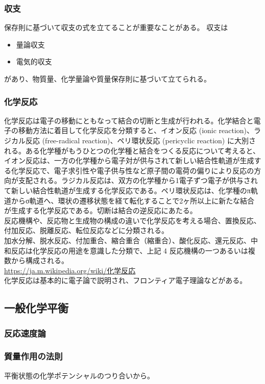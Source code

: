 \documentclass[dvipdfmx,uplatex]{jsarticle}
\begin{document}
\subsubsection{収支}
保存則に基づいて収支の式を立てることが重要なことがある。
収支は \\
\begin{itemize}
\item 量論収支
\item 電気的収支
\end{itemize}
があり、物質量、化学量論や質量保存則に基づいて立てられる。

\subsubsection{化学反応}
化学反応は電子の移動にともなって結合の切断と生成が行われる。化学結合と電子の移動方法に着目して化学反応を分類すると、イオン反応 (ionic reaction)、ラジカル反応 (free-radical reaction)、ペリ環状反応 (pericyclic reaction) に大別される。ある化学種がもうひとつの化学種と結合をつくる反応について考えると、イオン反応は、一方の化学種から電子対が供与されて新しい結合性軌道が生成する化学反応で、電子求引性や電子供与性など原子間の電荷の偏りにより反応の方向が支配される。ラジカル反応は、双方の化学種から1電子ずつ電子が供与されて新しい結合性軌道が生成する化学反応である。ペリ環状反応は、化学種のπ軌道からσ軌道へ、環状の遷移状態を経て転化することで2ヶ所以上に新たな結合が生成する化学反応である。切断は結合の逆反応にあたる。 \\
反応機構や、反応物と生成物の構成の違いで化学反応を考える場合、置換反応、付加反応、脱離反応、転位反応などに分類される。 \\
加水分解、脱水反応、付加重合、縮合重合（縮重合）、酸化反応、還元反応、中和反応は化学反応の用途を意識した分類で、上記 4 反応機構の一つあるいは複数から構成される。 \\
\url{https://ja.m.wikipedia.org/wiki/化学反応} \\
化学反応は基本的に電子論で説明され、フロンティア電子理論などがある。


\subsection{一般化学平衡}
\subsubsection{反応速度論}
\subsubsection{質量作用の法則}
平衡状態の化学ポテンシャルのつり合いから。
\end{document}
